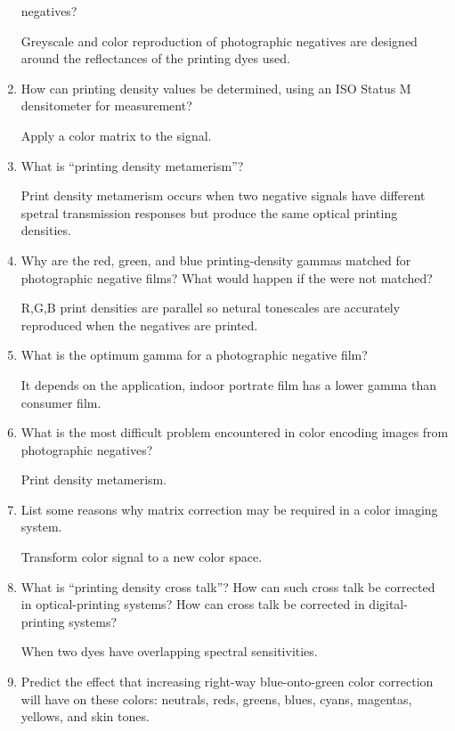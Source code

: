 \begin{enumerate}
negatives?
\newline \par Greyscale and color reproduction of photographic
negatives are designed around the reflectances of the printing
dyes used.
\newline
\item  How can printing density
values be determined, using an ISO Status M densitometer for
measurement?
\newline \par Apply a color matrix to the signal.
\newline
\item  What is “printing
density metamerism”?
\newline \par Print density metamerism occurs when two negative signals have different spetral
transmission responses but produce the same optical printing
densities.
 \newline
\item  Why are the
red, green, and blue printing-density gammas matched for
photographic negative films? What would happen if the were not
matched?
\newline \par R,G,B print densities are parallel so netural
tonescales are accurately reproduced when the negatives are
printed.
\newline
\item  What is the optimum gamma
for a photographic negative film?
\newline \par It depends on the application, indoor portrate film
has a lower gamma than consumer film.
\newline
\item What is the most difficult problem encountered in color
encoding images from photographic negatives?
\newline \par Print density metamerism.

\item List some reasons why matrix correction may be required in a
color imaging system.
\newline \par Transform color signal to a new color space.
\newline
\item What is “printing density cross talk”? How can such cross
talk be corrected in optical-printing systems? How can cross talk
be corrected in digital-printing systems?
\newline \par When two dyes have overlapping spectral
sensitivities.
\newline
\item Predict the effect that increasing right-way blue-onto-green
color correction will have on these colors: neutrals, reds,
greens, blues, cyans, magentas, yellows, and skin tones.
\end{enumerate} 